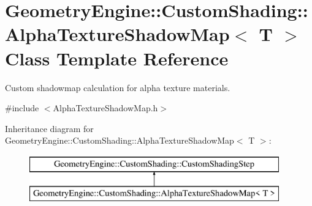 \hypertarget{class_geometry_engine_1_1_custom_shading_1_1_alpha_texture_shadow_map}{}\section{Geometry\+Engine\+::Custom\+Shading\+::Alpha\+Texture\+Shadow\+Map$<$ T $>$ Class Template Reference}
\label{class_geometry_engine_1_1_custom_shading_1_1_alpha_texture_shadow_map}


Custom shadowmap calculation for alpha texture materials.  




{\ttfamily \#include $<$Alpha\+Texture\+Shadow\+Map.\+h$>$}

Inheritance diagram for Geometry\+Engine\+::Custom\+Shading\+::Alpha\+Texture\+Shadow\+Map$<$ T $>$\+:\begin{figure}[H]
\begin{center}
\leavevmode
\includegraphics[height=2.000000cm]{class_geometry_engine_1_1_custom_shading_1_1_alpha_texture_shadow_map}
\end{center}
\end{figure}
